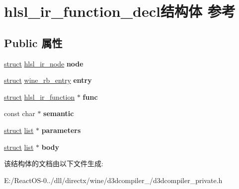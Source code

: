\hypertarget{structhlsl__ir__function__decl}{}\section{hlsl\+\_\+ir\+\_\+function\+\_\+decl结构体 参考}
\label{structhlsl__ir__function__decl}
\subsection*{Public 属性}
\begin{DoxyCompactItemize}
\item 
\mbox{\label{structhlsl__ir__function__decl_a2f6318425afd8a1f39c1397af3bfb81e}} 
\hyperlink{interfacestruct}{struct} \hyperlink{structhlsl__ir__node}{hlsl\+\_\+ir\+\_\+node} {\bfseries node}
\item 
\mbox{\label{structhlsl__ir__function__decl_a2c09f78f9b0d8f08bb7a6a82f639fa5c}} 
\hyperlink{interfacestruct}{struct} \hyperlink{structwine__rb__entry}{wine\+\_\+rb\+\_\+entry} {\bfseries entry}
\item 
\mbox{\label{structhlsl__ir__function__decl_a5efc8bfe837188dec88da56978e9103c}} 
\hyperlink{interfacestruct}{struct} \hyperlink{structhlsl__ir__function}{hlsl\+\_\+ir\+\_\+function} $\ast$ {\bfseries func}
\item 
\mbox{\label{structhlsl__ir__function__decl_ae58b85f5328a39d878095b310d4f656b}} 
const char $\ast$ {\bfseries semantic}
\item 
\mbox{\label{structhlsl__ir__function__decl_abea6ee9c1b1cb39568929d42ca5600cc}} 
\hyperlink{interfacestruct}{struct} \hyperlink{classlist}{list} $\ast$ {\bfseries parameters}
\item 
\mbox{\label{structhlsl__ir__function__decl_aee94eaf00e588929e8d1458ae90e67ba}} 
\hyperlink{interfacestruct}{struct} \hyperlink{classlist}{list} $\ast$ {\bfseries body}
\end{DoxyCompactItemize}


该结构体的文档由以下文件生成\+:\begin{DoxyCompactItemize}
\item 
E\+:/\+React\+O\+S-\/0../dll/directx/wine/d3dcompiler\+\_/d3dcompiler\+\_\+private.\+h\end{DoxyCompactItemize}
